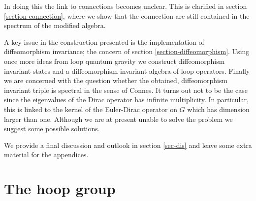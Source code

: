 \documentclass[12pt]{article}
\begin{document}
In doing this the link to connections becomes unclear. This is clarified in
section \ref{section-connection}, where we show that the connection are still contained in the
spectrum of the modified algebra.  


A key issue in the construction presented is the implementation of
diffeomorphism invariance; the concern of section \ref{section-diffeomorphism}. Using once more
ideas from loop quantum gravity we construct diffeomorphism
invariant states and a diffeomorphism invariant algebra of loop
operators. Finally we are concerned with the question whether the obtained,
diffeomorphism invariant triple is spectral in the sense of Connes. It turns
out not to be the case since the eigenvalues of the Dirac operator has infinite
multiplicity. In particular, this is linked to the kernel of the Euler-Dirac
operator on $G$ which has dimension larger than one. Although we are at
present unable to solve the problem we suggest some possible solutions.

We provide a final discussion and outlook in section \ref{sec-dis} and leave some
extra material for the appendices.



















\section{The hoop group}
\label{sec-hoopgroup}
\end{document}
